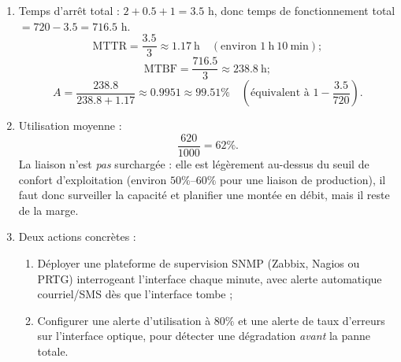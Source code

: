 \documentclass[11pt]{article}
\begin{document}
\begin{corrige}
\begin{enumerate}
\item Temps d'arrêt total : $2 + 0.5 + 1 = 3.5$ h, donc temps de fonctionnement total $= 720 - 3.5 = 716.5$ h.
\[ \text{MTTR} = \frac{3.5}{3} \approx 1.17\ \text{h} \quad (\text{environ } 1\ \text{h}\ 10\ \text{min}); \]
\[ \text{MTBF} = \frac{716.5}{3} \approx 238.8\ \text{h}; \]
\[ A = \frac{238.8}{238.8 + 1.17} \approx 0.9951 \approx 99.51\% \quad \left(\text{équivalent à } 1 - \frac{3.5}{720}\right). \]
\item Utilisation moyenne :
\[ \frac{620}{1000} = 62\%. \]
La liaison n'est \emph{pas} surchargée : elle est légèrement au-dessus du seuil de confort d'exploitation (environ $50\%$--$60\%$ pour une liaison de production), il faut donc surveiller la capacité et planifier une montée en débit, mais il reste de la marge.
\item Deux actions concrètes :
\begin{enumerate}
\item Déployer une plateforme de supervision SNMP (Zabbix, Nagios ou PRTG) interrogeant l'interface chaque minute, avec alerte automatique courriel/SMS dès que l'interface tombe ;
\item Configurer une alerte d'utilisation à $80\%$ et une alerte de taux d'erreurs sur l'interface optique, pour détecter une dégradation \emph{avant} la panne totale.
\end{enumerate}
\end{enumerate}
\end{corrige}
\end{document}

